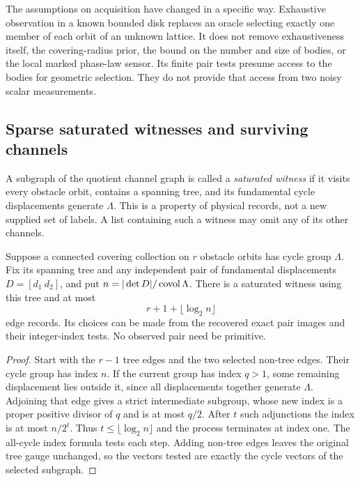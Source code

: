 The assumptions on acquisition have changed in a specific way. Exhaustive
observation in a known bounded disk replaces an oracle selecting exactly
one member of each orbit of an unknown lattice. It does not remove
exhaustiveness itself, the covering-radius prior, the bound on the number
and size of bodies, or the local marked phase-law sensor. Its finite pair
tests presume access to the bodies for geometric selection. They do not
provide that access from two noisy scalar measurements.

\subsection{Sparse saturated witnesses and surviving channels}
A subgraph of the quotient channel graph is called a \emph{saturated
witness} if it visits every obstacle orbit, contains a spanning tree,
and its fundamental cycle displacements generate $\Lambda$. This is
a property of physical records, not a new supplied set of labels.
A list containing such a witness may omit any of its other channels.

\begin{proposition}\label{prop:sparse-witness}
Suppose a connected covering collection on $r$ obstacle orbits has
cycle group $\Lambda$. Fix its spanning tree and any independent pair
of fundamental displacements $D=[d_1\ d_2]$, and put
$n=|\det D|/\operatorname{covol}\Lambda$. There is a saturated witness using this
tree and at most
\begin{equation}\label{eq:sparse-count}
                  r+1+\lfloor\log_2 n\rfloor
\end{equation}
edge records. Its choices can be made from the recovered exact pair
images and their integer-index tests. No observed pair need be primitive.
\end{proposition}
\begin{proof}
Start with the $r-1$ tree edges and the two selected non-tree edges.
Their cycle group has index $n$. If the current group has index $q>1$,
some remaining displacement lies outside it, since all displacements
together generate $\Lambda$. Adjoining that edge gives a strict
intermediate subgroup, whose new index is a proper positive divisor
of $q$ and is at most $q/2$. After $t$ such adjunctions the index is
at most $n/2^t$. Thus $t\le\lfloor\log_2 n\rfloor$ and the process
terminates at index one. The all-cycle index formula tests each step.
Adding non-tree edges leaves the original tree gauge unchanged, so the
vectors tested are exactly the cycle vectors of the selected subgraph.
\end{proof}

